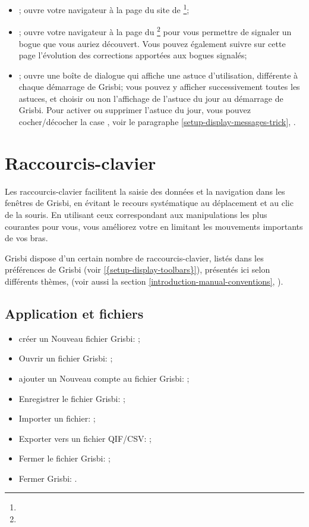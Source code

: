 \begin{itemize}
	\item {}; ouvre votre navigateur à la page du site de \footnote{\urlGrisbi{}};
	\item {}; ouvre votre navigateur à la page du \footnote{\urlBugTracker{}} pour vous permettre de signaler un bogue que vous auriez découvert. Vous pouvez également suivre sur cette page l'évolution des corrections apportées aux bogues signalés;
	\item {}; ouvre une boîte de dialogue qui affiche une astuce d'utilisation, différente à chaque démarrage de Grisbi; vous pouvez y afficher successivement toutes les astuces, et choisir ou non l'affichage de l'astuce du jour au démarrage de Grisbi. Pour activer ou supprimer l'astuce du jour, vous pouvez cocher/décocher la case , voir le paragraphe \vref{setup-display-messages-trick}, .
\end{itemize}


\section{Raccourcis-clavier\label{home-shortcuts}}


Les raccourcis-clavier facilitent la saisie des données et la navigation dans les fenêtres de Grisbi, en évitant le recours systématique au déplacement et au clic de la souris. En utilisant ceux correspondant aux manipulations les plus courantes pour vous, vous améliorez votre  en limitant les mouvements importants de vos bras.
 
Grisbi dispose d'un certain nombre de raccourcis-clavier, listés dans les préférences de Grisbi (voir \vref{{setup-display-toolbars}}), présentés ici selon différents thèmes, (voir aussi la section \vref{introduction-manual-conventions}, ).


\subsection{Application et fichiers}

\begin{itemize}
	\item créer un Nouveau fichier Grisbi: ;
	\item Ouvrir un fichier Grisbi: ;
	\item ajouter un Nouveau compte au fichier Grisbi: ;
	\item Enregistrer le fichier Grisbi: ;
	\item Importer un fichier: ;
	\item Exporter vers un fichier \gls{QIF}/\gls{CSV}: ;
	\item Fermer le fichier Grisbi: ;
	\item Fermer Grisbi: .
\end{itemize}



